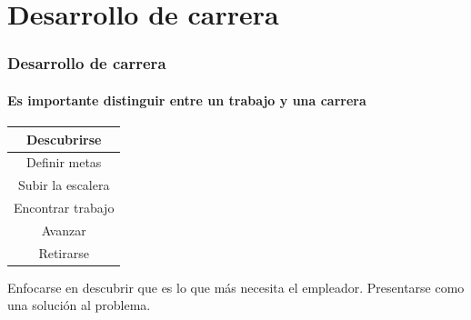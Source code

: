 \documentclass[xcolor=table]{beamer}
\begin{document}
	\section{Desarrollo de carrera}
	\begin{frame}
    		\frametitle{Desarrollo de carrera}
		\framesubtitle{Es importante distinguir entre un trabajo y una carrera}
		\begin{table}[]
			\begin{tabular}{|c|}
				\hline
				\rowcolor[HTML]{FD6864} 
				Descubrirse         \\ \hline
				\rowcolor[HTML]{FE996B} 
				Definir metas                      \\ \hline
				\rowcolor[HTML]{FFFE65} 
				{\color[HTML]{000000} Subir la escalera} \\ \hline
				\rowcolor[HTML]{67FD9A} 
				Encontrar trabajo                  \\ \hline
				\rowcolor[HTML]{38FFF8} 
				Avanzar                            \\ \hline
				\rowcolor[HTML]{DAE8FC} 
				Retirarse                          \\ \hline
			\end{tabular}
		\end{table}
		\begin{tcolorbox}[colback=white,colframe=udlacolour,title=El valor de la investigación]
    			Enfocarse en descubrir que es lo que más necesita el empleador. Presentarse como una solución al problema.
    		\end{tcolorbox}
	\end{frame}
\end{document}
